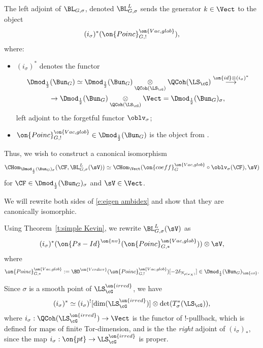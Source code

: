 \documentclass[9pt]{amsart}
\theoremstyle{remark}
\theoremstyle{definition}
\theoremstyle{remark}
\newcommand{\thmref}[1]{Theorem~\ref{#1}}
\numberwithin{equation}{section}
\begin{document}
\medskip

The left adjoint of $\BL_{G,\sigma}$, denoted $\BL^L_{G,\sigma}$ sends the generator $k\in \Vect$ to
the object
$$(i_\sigma)^*(\on{Poinc}^{\on{Vac,glob}}_{G,!}),$$
where:

\begin{itemize}

\item $(i_\sigma)^*$ denotes the functor
\begin{multline*} 
\Dmod_{\frac{1}{2}}(\Bun_G)\simeq \Dmod_{\frac{1}{2}}(\Bun_G)\underset{\QCoh(\LS_\cG)}\otimes 
\QCoh(\LS_\cG) \overset{\on{id}\otimes (i_\sigma)^*}\longrightarrow \\
\to \Dmod_{\frac{1}{2}}(\Bun_G)\underset{\QCoh(\LS_\cG)}\otimes \Vect=
\Dmod_{\frac{1}{2}}(\Bun_G)_\sigma,
\end{multline*}
left adjoint to the forgetful functor $\oblv_\sigma$;

\medskip

\item $\on{Poinc}^{\on{Vac,glob}}_{G,!}\in \Dmod_{\frac{1}{2}}(\Bun_G)$ is the object from \cite[Sect. 1.3]{GLC1}.

\end{itemize} 

\sssec{}

Thus, we wish to construct a canonical isomorphism
\begin{equation} \label{e:eigen ambidex}
\CHom_{\Dmod_{\frac{1}{2}}(\Bun_G)_\sigma}(\CF,\BL^L_{G,\sigma}(\sV))\simeq \CHom_{\Vect}(\on{coeff}_G^{\on{Vac,glob}}\circ
\oblv_\sigma(\CF),\sV)
\end{equation}
for $\CF\in \Dmod_{\frac{1}{2}}(\Bun_G)_\sigma$ and $\sV\in \Vect$. 

\medskip

We will rewrite both sides of \eqref{e:eigen ambidex} and show that they are canonically isomorphic. 

\sssec{}

Using \thmref{t:simple Kevin}, we rewrite $\BL^L_{G,\sigma}(\sV)$ as
\begin{equation} \label{e:sigma Poinc Vac}
(i_\sigma)^*(\on{Ps-Id}^{\on{nv}}(\on{Poinc}^{\on{Vac,glob}}_{G,*}))\otimes \sV,
\end{equation}
where 
$$\on{Poinc}^{\on{Vac,glob}}_{G,*}:=\BD^{\on{Verdier}}(\on{Poinc}^{\on{Vac,glob}}_{G,!})[-2\delta_{N_{\rho(\omega_X)}}]\in \Dmod_{\frac{1}{2}}(\Bun_G)_{\on{co}}.$$ 

\medskip 

Since $\sigma$ is a smooth point of $\LS^{\on{irred}}_\cG$, we have
$$(i_\sigma)^*\simeq (i_\sigma)^![\dim(\LS^{\on{irred}}_\cG)]\otimes \det(T^*_\sigma(\LS_\cG)),$$
where $i_\sigma:\QCoh(\LS_\cG^{\on{irred}})\to \Vect$ is the functor of !-pullback, which is defined 
for maps of finite Tor-dimension, and is the the \emph{right} adjoint of $(i_\sigma)_*$, since the map
$i_\sigma:\on{pt}\to \LS^{\on{irred}}_\cG$ is proper. 
\end{document}
